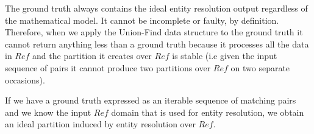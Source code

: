 The ground truth always contains the ideal entity resolution output
regardless of the mathematical model.
It cannot be incomplete or faulty, by definition.
Therefore, when we apply the Union-Find data structure to the ground truth
it cannot return anything less than a ground truth because it processes all
the data in $Ref$ and the partition it creates over $Ref$ is stable (i.e
given the input sequence of pairs it cannot produce two partitions over $Ref$
on two separate occasions).

If we have a ground truth expressed as an iterable sequence of matching
pairs and we know the input $Ref$ domain that is used for entity resolution,
we obtain an ideal partition induced by entity resolution over $Ref$.

